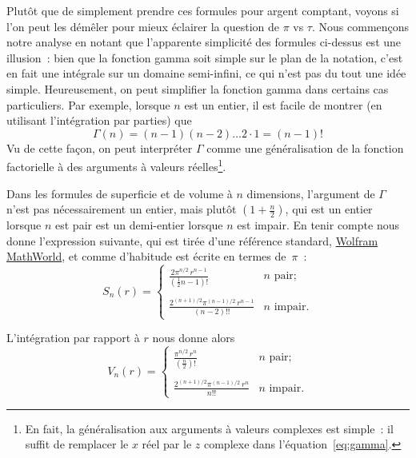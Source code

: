 Plutôt que de simplement prendre ces formules pour argent comptant,
voyons si l'on peut les démêler pour mieux éclairer la question de $\pi$ vs
$\tau$. Nous commençons notre analyse en notant que l'apparente simplicité des
formules ci-dessus est une illusion~: bien que la fonction gamma soit simple sur
le plan de la notation, c'est en fait une intégrale sur un domaine
semi-infini, ce qui n'est pas du tout une idée simple. Heureusement, on peut
simplifier la fonction gamma dans certains cas particuliers. Par exemple,
lorsque $n$ est un entier, il est facile de montrer (en utilisant l'intégration
par parties) que
\[
\Gamma(n) = (n-1)(n-2)\ldots 2\cdot 1 = (n-1)!
\]
Vu de cette façon, on peut interpréter $\Gamma$ comme une généralisation de la
fonction factorielle à des arguments à valeurs réelles\ns\footnote{En fait, la
généralisation aux arguments à valeurs complexes est simple~: il suffit de
remplacer le $x$ réel par le $z$ complexe dans l'équation~\eqref{eq:gamma}.}.

Dans les formules de superficie et de volume à $n$ dimensions, l'argument de
$\Gamma$ n'est pas nécessairement un entier, mais plutôt $\left(1 +
\frac{n}{2}\right)$, qui est un entier lorsque $n$ est pair est un demi-entier
lorsque $n$ est impair. En tenir compte nous donne l'expression suivante, qui est
tirée d'une référence standard,
\href{https://mathworld.wolfram.com/Hypersphere.html}{Wolfram MathWorld}, et
comme d'habitude est écrite en termes de~$\pi$~:
\begin{equation}
\label{eq:surface_area_mathworld}
S_n(r) = \begin{cases}
\displaystyle \frac{2\pi^{n/2}\,r^{n-1}}{(\frac{1}{2}n - 1)!} & n \text{ pair}; \\ \\
 \displaystyle \frac{2^{(n+1)/2}\pi^{(n-1)/2}\,r^{n-1}}{(n-2)!!} & n \text{ impair}.
\end{cases}
\end{equation}

L'intégration par rapport à $r$ nous donne alors
\begin{equation}
\label{eq:volume_mathworld}
V_n(r) = \begin{cases}
\displaystyle \frac{\pi^{n/2}\,r^n}{(\frac{n}{2})!} & n \text{ pair}; \\ \\
\displaystyle \frac{2^{(n+1)/2}\pi^{(n-1)/2}\,r^n}{n!!} & n \text{ impair}.
\end{cases}
\end{equation}

